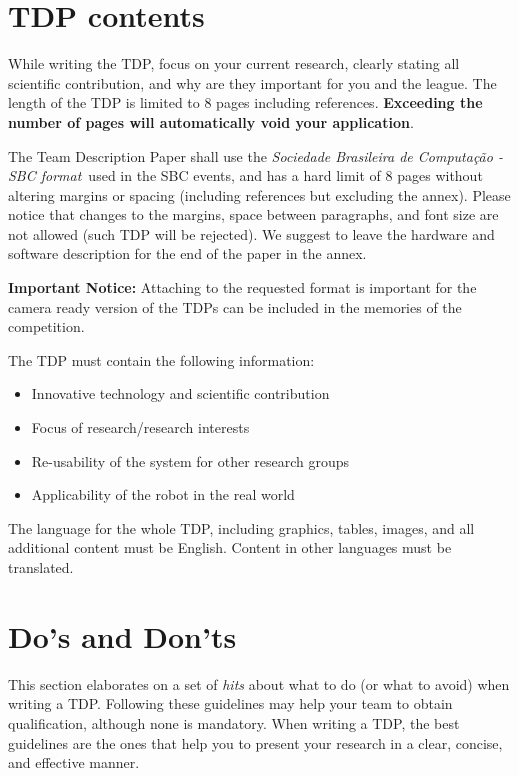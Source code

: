 \documentclass[12pt]{article}
\begin{document}
\section{TDP contents}
While writing the TDP, focus on your current research, clearly stating all scientific contribution, and why are they important for you and the league. The length of the TDP is limited to 8 pages including references. \textbf{\color{red} Exceeding the number of pages will automatically void your application}.

The Team Description Paper shall use the \textit{Sociedade Brasileira de Computação - SBC format}\footnotemark~used in the SBC events, and has a hard limit of 8 pages without altering margins or spacing (including references but excluding the annex).
Please notice that changes to the margins, space between paragraphs, and font size are not allowed (such TDP will be rejected). We suggest to leave the hardware and software description for the end of the paper in the annex.

\textbf{Important Notice:} Attaching to the requested format is important for the camera ready version of the TDPs can be included in the memories of the competition.

\noindent The TDP must contain the following information:

\begin{itemize}[nosep]
	\item Innovative technology and scientific contribution
	\item Focus of research/research interests
	\item Re-usability of the system for other research groups
	\item Applicability of the robot in the real world
\end{itemize}

The language for the whole TDP, including graphics, tables, images, and all additional content must be English. Content in other languages must be translated.


\section{Do's and Don'ts}
This section elaborates on a set of \textit{hits} about what to do (or what to avoid) when writing a TDP.
Following these guidelines may help your team to obtain qualification, although none is mandatory.
When writing a TDP, the best guidelines are the ones that help you to present your research in a clear, concise, and effective manner.
\end{document}
